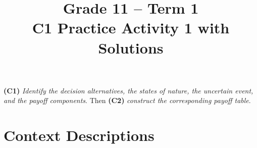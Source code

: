 \makeatletter
{}
\makeatother






\title{Grade 11 -- Term 1 \\ C1 Practice Activity 1 with Solutions}
\author{}
\date{}

\pagestyle{empty}

\geometry{
	margin=0.3in,
	bottom=0.3in
}


\newcommand{\PayoffMatrix}[4]{%
	\(\left(\begin{array}{@{}cc@{}}#1 & #2 \\ #3 & #4\end{array}\right)\)%
}



	\vspace{-8mm}	
	\textbf{(C1)} \textit{Identify the decision alternatives, the states of nature, the uncertain event, and the payoff components}. Then \textbf{(C2)} \textit{construct the corresponding payoff table}. \vspace{-7mm}
	
	\section*{Context Descriptions}
	\vspace{-3mm}
	
